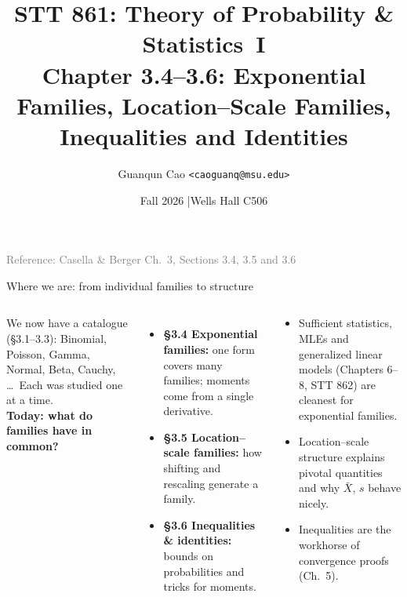 \documentclass[aspectratio=169,t,10pt]{beamer}
\title[L19]{STT 861: Theory of Probability \& Statistics~I\\[4pt]
       \large Chapter 3.4--3.6: Exponential Families, Location--Scale Families,\\ Inequalities and Identities}
\author[Cao]{Guanqun Cao \quad\texttt{<caoguanq@msu.edu>}}
\institute[MSU]{Department of Statistics \& Probability\\Michigan State University}
\date[Fall 2026]{Fall 2026 \quad|\quad Wells Hall C506}
\begin{document}
\begin{frame}[plain]
  \titlepage
  \begin{center}\small\textcolor{gray}{Reference: Casella \& Berger Ch.~3, Sections 3.4, 3.5 and 3.6}\end{center}
\end{frame}

\begin{frame}{Where we are: from individual families to structure}
  \begin{columns}[T]
  We now have a catalogue (\S3.1--3.3): Binomial, Poisson, Gamma, Normal, Beta, Cauchy, \dots\ Each was studied one at a time.
  \medskip\\
  \textbf{Today: what do families have in common?}
  \begin{itemize}\small
    \item \textbf{\S3.4 Exponential families:} one form covers many families; moments come from a single derivative.
    \item \textbf{\S3.5 Location--scale families:} how shifting and rescaling generate a family.
    \item \textbf{\S3.6 Inequalities \& identities:} bounds on probabilities and tricks for moments.
  \end{itemize}
  \begin{tcolorbox}[mynote={Why this matters later}]\small
  \begin{itemize}
    \item Sufficient statistics, MLEs and generalized linear models (Chapters 6--8, STT 862) are cleanest for exponential families.
    \item Location--scale structure explains pivotal quantities and why $\bar X$, $s$ behave nicely.
    \item Inequalities are the workhorse of convergence proofs (Ch.~5).
  \end{itemize}
  \end{tcolorbox}
  \end{columns}
\end{frame}
\end{document}
